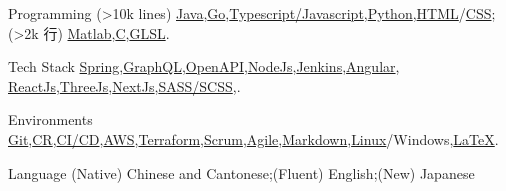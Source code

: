 
\begin{cvskills}
\cvskill
{Programming}
{(>10k lines) \href{https://www.java.com/en/}{Java},\href{https://go.dev/}{Go},\href{https://www.javascript.com/}{Typescript/Javascript},\href{https://www.python.org/}{Python},\href{https://developer.mozilla.org/en-US/docs/Glossary/HTML5}{HTML}/\href{https://developer.mozilla.org/en-US/docs/Web/CSS}{CSS};(>2k 行) \href{https://uk.mathworks.com/products/matlab.html}{Matlab},\href{https://en.wikipedia.org/wiki/C_(programming_language)}{C},\href{https://www.khronos.org/opengl/wiki/OpenGL_Shading_Language}{GLSL}.}

\cvskill
{Tech Stack}
{\href{https://spring.io/}{Spring},\href{https://graphql.org/}{GraphQL},\href{https://swagger.io/specification/}{OpenAPI},\href{https://nodejs.org/en/}{NodeJs},\href{https://www.jenkins.io/}{Jenkins},\href{https://angular.io/}{Angular}, \href{https://reactjs.org/}{ReactJs},\href{https://threejs.org/}{ThreeJs},\href{https://nextjs.org/}{NextJs},\href{https://sass-lang.com/}{SASS/SCSS},.}

\cvskill
{Environments}
{\href{https://git-scm.com/}{Git},\href{https://en.wikipedia.org/wiki/Code_review}{CR},\href{https://www.redhat.com/en/topics/devops/what-is-ci-cd}{CI/CD},\href{https://aws.amazon.com/}{AWS},\href{https://www.terraform.io/}{Terraform},\href{https://www.scrum.org/resources/what-is-scrum}{Scrum},\href{https://www.atlassian.com/agile}{Agile},\href{https://en.wikipedia.org/wiki/Markdown}{Markdown},\href{https://en.wikipedia.org/wiki/Unix}{Linux}/Windows,\href{https://www.latex-project.org/}{LaTeX}.}

\cvskill
{Language}
{(Native) Chinese and Cantonese;(Fluent) English;(New) Japanese}

\end{cvskills}